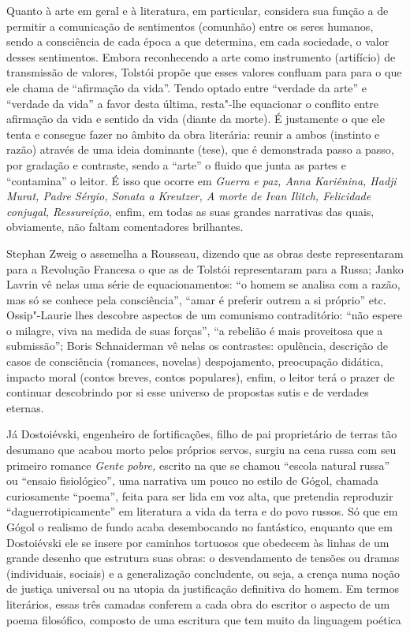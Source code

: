 Quanto à arte em geral e à literatura, em particular, considera sua
função a de permitir a comunicação de sentimentos (comunhão) entre os
seres humanos, sendo a consciência de cada época a que determina, em
cada sociedade, o valor desses sentimentos. Embora reconhecendo a arte
como instrumento (artifício) de transmissão de valores, Tolstói propõe
que esses valores confluam para para o que ele chama de ``afirmação da
vida''. Tendo optado entre ``verdade da arte'' e ``verdade da vida''
a favor desta última, resta"-lhe equacionar o conflito entre afirmação da
vida e sentido da vida (diante da morte). É justamente o que ele tenta e
consegue fazer no âmbito da obra literária: reunir a ambos (instinto e
razão) através de uma ideia dominante (tese), que é demonstrada passo a
passo, por gradação e contraste, sendo a ``arte'' o fluido que junta as
partes e ``contamina'' o leitor. É isso que ocorre em \emph{Guerra e
paz, Anna Kariênina, Hadji Murat, Padre Sérgio, Sonata a Kreutzer, A
morte de Ivan Ilitch, Felicidade conjugal, Ressureição}, enfim, em todas
as suas grandes narrativas das quais, obviamente, não faltam comentadores
brilhantes.

Stephan Zweig o assemelha a Rousseau, dizendo que as obras deste
representaram para a Revolução Francesa o que as de Tolstói
representaram para a Russa; Janko Lavrin vê nelas uma série de
equacionamentos: ``o homem se analisa com a razão, mas só se conhece
pela consciência'', ``amar é preferir outrem a si próprio'' etc. Ossip"-Laurie lhes descobre aspectos de um
comunismo contraditório: ``não espere o milagre, viva na medida de
suas forças'', ``a rebelião é mais proveitosa que a submissão''; Boris
Schnaiderman vê nelas os contrastes: opulência, descrição de casos de
consciência (romances, novelas)  despojamento, preocupação didática,
impacto moral (contos breves, contos populares), enfim, o leitor terá o
prazer de continuar descobrindo por si esse universo de propostas sutis
e de verdades eternas.

Já Dostoiévski, engenheiro de fortificações, filho de pai proprietário
de terras tão desumano que acabou morto pelos próprios servos, surgiu na
cena russa com seu primeiro romance \emph{Gente pobre,} escrito na que
se chamou ``escola natural russa'' ou ``ensaio fisiológico'', uma narrativa um pouco no estilo de Gógol,
chamada curiosamente ``poema'', feita para ser lida em voz alta, que
pretendia reproduzir ``daguerrotipicamente'' em literatura a vida da terra e do povo russos.
Só que em Gógol o realismo de fundo acaba desembocando no fantástico,
enquanto que em Dostoiévski ele se insere por caminhos tortuosos que
obedecem às linhas de um grande desenho que estrutura suas obras: o
desvendamento de tensões ou dramas (individuais, sociais) e a generalização concludente, ou seja, a crença
numa noção de justiça universal ou na utopia da justificação definitiva
do homem. Em termos literários, essas três camadas conferem a cada obra
do escritor o aspecto de um poema filosófico, composto de uma escritura
que tem muito da linguagem poética

